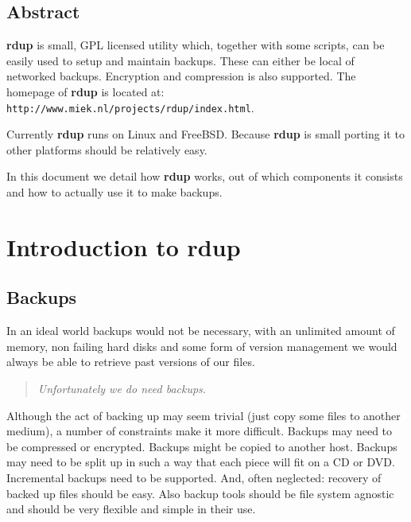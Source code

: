 \documentclass[a4paper, openany]{blocksbook}
\newcommand{\rdup}{\textbf{rdup}}
\newcommand{\url}[1]{\texttt{#1}}
\begin{document}
\section*{Abstract}
\rdup{} is small, GPL licensed utility which, together with some scripts, can
be easily used to setup and maintain backups. These can either be local
of networked backups. Encryption and compression is also supported.
The homepage of \rdup{} is located at: \\
\url{http://www.miek.nl/projects/rdup/index.html}.

Currently \rdup{} runs on Linux and FreeBSD. Because \rdup{} is
small porting it to other platforms should be relatively easy.

In this document we detail how \rdup{} works, out of which components
it consists and how to actually use it to make backups.

\tableofcontents

\chapter{Introduction to \rdup}

\section{Backups}
In an ideal world backups would not be necessary, with an un\-limited
amount of memory, non failing hard disks and some form of version
management we would always be able to retrieve past versions of our files.
\begin{quote}
\emph{Unfortunately we do need backups.}
\end{quote}
Although the act of backing up may seem trivial (just copy some files
to another medium), a number of constraints make it more difficult. 
Backups may need to be compressed or encrypted. Backups might be copied
to another host. Backups may need to be split up in such a way that
each piece will fit on a CD or DVD. Incremental backups need to be
supported. And, often neglected: recovery of backed up
files should be easy.  Also backup tools should be file system agnostic
and should be very flexible and simple in their use.
\end{document}
